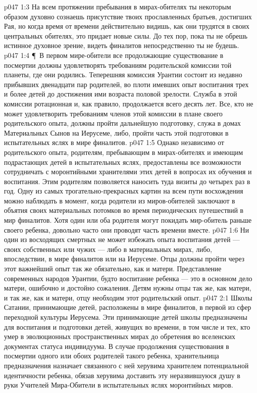 \vs p047 1:3 На всем протяжении пребывания в мирах\hyp{}обителях ты некоторым образом духовно сознаешь присутствие твоих прославленных братьев, достигших Рая, но когда время от времени действительно видишь, как они трудятся в своих центральных обителях, это придает новые силы. До тех пор, пока ты не обрешь истинное духовное зрение, видеть финалитов непосредственно ты не будешь.
\vs p047 1:4 \P\ В первом мире\hyp{}обители все продолжающие существование в посмертии должны удовлетворять требованиям родительской комиссии той планеты, где они родились. Теперешняя комиссия Урантии состоит из недавно прибывших двенадцати пар родителей, во плоти имевших опыт воспитания трех и более детей до достижения ими возраста половой зрелости. Служба в этой комиссии ротационная и, как правило, продолжается всего десять лет. Все, кто не может удовлетворить требованиям членов этой комиссии в плане своего родительского опыта, должны пройти дальнейшую подготовку, служа в домах Материальных Сынов на Иерусеме, либо, пройти часть этой подготовки в испытательных яслях в мире финалитов.
\vs p047 1:5 Однако независимо от родительского опыта, родителям, пребывающим в мирах\hyp{}обителях и имеющим подрастающих детей в испытательных яслях, предоставлены все возможности сотрудничать с моронтийными хранителями этих детей в вопросах их обучения и воспитания. Этим родителям позволяется наносить туда визиты до четырех раз в год. Одну из самых трогательно\hyp{}прекрасных картин на всем пути восхождения можно наблюдать в момент, когда родители из миров\hyp{}обителей заключают в объятия своих материальных потомков во время периодических путешествий в мир финалитов. Хотя один или оба родителя могут покидать мир\hyp{}обитель раньше своего ребенка, довольно часто они проводят часть времени вместе.
\vs p047 1:6 Ни один из восходящих смертных не может избежать опыта воспитания детей --- своих собственных или чужих --- либо в материальных мирах, либо, впоследствии, в мире финалитов или на Иерусеме. Отцы должны пройти через этот важнейший опыт так же обязательно, как и матери. Представление современных народов Урантии, будто воспитание ребенка --- это в основном дело матери, ошибочно и достойно сожаления. Детям нужны отцы так же, как матери, и так же, как и матери, отцу необходим этот родительский опыт.
\vs p047 2:1 Школы Сатании, принимающие детей, расположены в мире финалитов, в первой из сфер переходной культуры Иерусема. Эти принимающие детей школы предназначены для воспитания и подготовки детей, живущих во времени, в том числе и тех, кто умер в эволюционных пространственных мирах до обретения во вселенских документах статуса индивидуума. В случае продолжения существования в посмертии одного или обоих родителей такого ребенка, хранительница предназначения назначает связанного с ней херувима хранителем потенциальной идентичности ребенка, обязав херувима доставить эту неразвившуюся душу в руки Учителей Мира\hyp{}Обители в испытательных яслях моронтийных миров.
